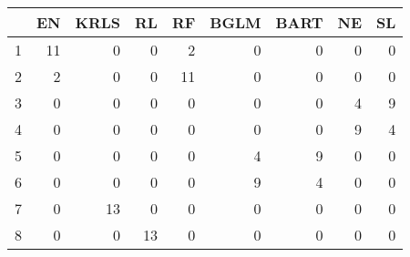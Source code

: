 \begin{table}[ht]
\centering
\begin{tabular}{rrrrrrrrr}
  \hline
 & EN & KRLS & RL & RF & BGLM & BART & NE & SL \\ 
  \hline
1 &  11 &   0 &   0 &   2 &   0 &   0 &   0 &   0 \\ 
  2 &   2 &   0 &   0 &  11 &   0 &   0 &   0 &   0 \\ 
  3 &   0 &   0 &   0 &   0 &   0 &   0 &   4 &   9 \\ 
  4 &   0 &   0 &   0 &   0 &   0 &   0 &   9 &   4 \\ 
  5 &   0 &   0 &   0 &   0 &   4 &   9 &   0 &   0 \\ 
  6 &   0 &   0 &   0 &   0 &   9 &   4 &   0 &   0 \\ 
  7 &   0 &  13 &   0 &   0 &   0 &   0 &   0 &   0 \\ 
  8 &   0 &   0 &  13 &   0 &   0 &   0 &   0 &   0 \\ 
   \hline
\end{tabular}
\end{table}
